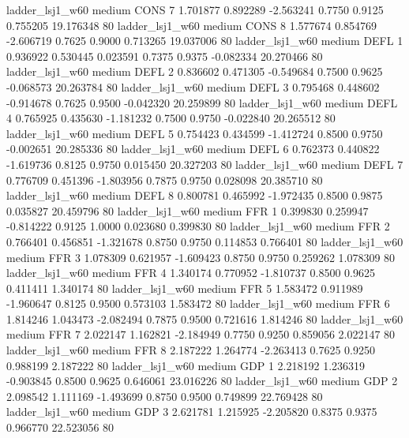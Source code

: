        ladder_lsj1_w60     medium     CONS                 7  1.701877 0.892289 -2.563241 0.7750 0.9125  0.755205   19.176348 80
       ladder_lsj1_w60     medium     CONS                 8  1.577674 0.854769 -2.606719 0.7625 0.9000  0.713265   19.037006 80
       ladder_lsj1_w60     medium     DEFL                 1  0.936922 0.530445  0.023591 0.7375 0.9375 -0.082334   20.270466 80
       ladder_lsj1_w60     medium     DEFL                 2  0.836602 0.471305 -0.549684 0.7500 0.9625 -0.068573   20.263784 80
       ladder_lsj1_w60     medium     DEFL                 3  0.795468 0.448602 -0.914678 0.7625 0.9500 -0.042320   20.259899 80
       ladder_lsj1_w60     medium     DEFL                 4  0.765925 0.435630 -1.181232 0.7500 0.9750 -0.022840   20.265512 80
       ladder_lsj1_w60     medium     DEFL                 5  0.754423 0.434599 -1.412724 0.8500 0.9750 -0.002651   20.285336 80
       ladder_lsj1_w60     medium     DEFL                 6  0.762373 0.440822 -1.619736 0.8125 0.9750  0.015450   20.327203 80
       ladder_lsj1_w60     medium     DEFL                 7  0.776709 0.451396 -1.803956 0.7875 0.9750  0.028098   20.385710 80
       ladder_lsj1_w60     medium     DEFL                 8  0.800781 0.465992 -1.972435 0.8500 0.9875  0.035827   20.459796 80
       ladder_lsj1_w60     medium      FFR                 1  0.399830 0.259947 -0.814222 0.9125 1.0000  0.023680    0.399830 80
       ladder_lsj1_w60     medium      FFR                 2  0.766401 0.456851 -1.321678 0.8750 0.9750  0.114853    0.766401 80
       ladder_lsj1_w60     medium      FFR                 3  1.078309 0.621957 -1.609423 0.8750 0.9750  0.259262    1.078309 80
       ladder_lsj1_w60     medium      FFR                 4  1.340174 0.770952 -1.810737 0.8500 0.9625  0.411411    1.340174 80
       ladder_lsj1_w60     medium      FFR                 5  1.583472 0.911989 -1.960647 0.8125 0.9500  0.573103    1.583472 80
       ladder_lsj1_w60     medium      FFR                 6  1.814246 1.043473 -2.082494 0.7875 0.9500  0.721616    1.814246 80
       ladder_lsj1_w60     medium      FFR                 7  2.022147 1.162821 -2.184949 0.7750 0.9250  0.859056    2.022147 80
       ladder_lsj1_w60     medium      FFR                 8  2.187222 1.264774 -2.263413 0.7625 0.9250  0.988199    2.187222 80
       ladder_lsj1_w60     medium      GDP                 1  2.218192 1.236319 -0.903845 0.8500 0.9625  0.646061   23.016226 80
       ladder_lsj1_w60     medium      GDP                 2  2.098542 1.111169 -1.493699 0.8750 0.9500  0.749899   22.769428 80
       ladder_lsj1_w60     medium      GDP                 3  2.621781 1.215925 -2.205820 0.8375 0.9375  0.966770   22.523056 80
